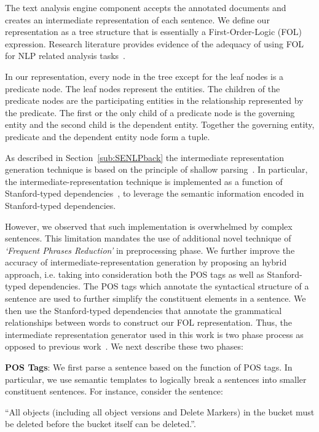 The text analysis engine component accepts the annotated documents and creates an intermediate representation of each sentence.
We define our representation as a tree structure that is essentially a First-Order-Logic (FOL) expression.
Research literature provides evidence of the adequacy of using FOL for NLP related analysis tasks~\cite{Sinha2009,Sinha2010,pandita12:inferring, pandita13:WHYPER}.

In our representation, every node in the tree except for the leaf nodes is a predicate node. 
The leaf nodes represent the entities.
The children of the predicate nodes are the participating entities in the relationship represented by the predicate.
The first or the only child of a predicate node is the governing entity and the second child is the dependent entity.
Together the governing entity, predicate and the dependent entity node form a tuple.  


As described in Section~\ref{sub:SENLPback} the intermediate representation generation technique is based on the principle of shallow parsing~\cite{Branimir2000}. 
In particular, the intermediate-representation technique is implemented as a function of Stanford-typed dependencies~\cite{Marneffe06LREC,Marneffe08COLING,SNLP,KleinNIPS03}, to leverage the semantic information encoded in Stanford-typed dependencies.


However, we observed that such implementation is overwhelmed by complex sentences.
This limitation mandates the use of additional novel technique of \textit{`Frequent Phrases Reduction'} in preprocessing phase.
We further improve the accuracy of intermediate-representation generation by proposing an hybrid approach, i.e. taking into consideration both the POS tags as well as Stanford-typed dependencies.
The POS tags which annotate the syntactical structure of a sentence are used to further simplify the constituent elements in a sentence. 
We then use the Stanford-typed dependencies that annotate the grammatical relationships between words to construct our FOL representation.
Thus, the intermediate representation generator used in this work is two phase process as opposed to previous work~\cite{pandita12:inferring, pandita13:WHYPER}. 
We next describe these two phases:

\textbf{POS Tags}: We first parse a sentence based on the function of POS tags. 
In particular, we use semantic templates to logically break a sentences into smaller constituent sentences. 
For instance, consider the sentence:

\begin{center}
\scriptsize``All objects (including all object versions and Delete Markers) in the bucket must be deleted before the bucket itself can be deleted.''. \normalsize
\end{center}


